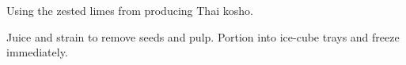 \documentclass[main]{subfiles}
\begin{document}
Using the zested limes from producing Thai kosho.

\begin{rec}
Juice and strain to remove seeds and pulp.
Portion into ice-cube trays and freeze immediately.
\end{rec}
\end{document}
